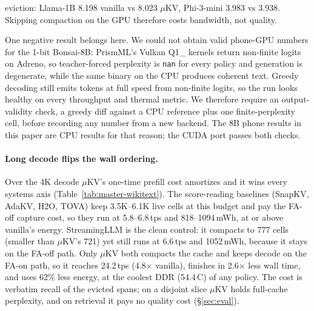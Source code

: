 \documentclass[sigconf, anonymous=false, screen=true]{acmart}
\newcommand{\ub}{\_\allowbreak}
\begin{document}
eviction: Llama-1B 8.198 vanilla vs 8.023 $\mu$KV, Phi-3-mini 3.983 vs 3.938. Skipping compaction on the GPU therefore costs bandwidth, not quality.

One negative result belongs here. We could not obtain valid phone-GPU numbers for the 1-bit Bonsai-8B: PrismML's Vulkan Q1\ub 0 kernels return non-finite logits on Adreno, so teacher-forced perplexity is \texttt{nan} for every policy and generation is degenerate, while the same binary on the CPU produces coherent text. Greedy decoding still emits tokens at full speed from non-finite logits, so the run looks healthy on every throughput and thermal metric. We therefore require an output-validity check, a greedy diff against a CPU reference plus one finite-perplexity cell, before recording any number from a new backend. The 8B phone results in this paper are CPU results for that reason; the CUDA port passes both checks.

\paragraph{Long decode flips the wall ordering.}
Over the 4K decode $\mu$KV's one-time prefill cost amortizes and it wins every systems axis (Table~\ref{tab:master-wikitext}). The score-reading baselines (SnapKV, AdaKV, H2O, TOVA) keep 3.5K--6.1K live cells at this budget and pay the FA-off capture cost, so they run at 5.8--6.8\,tps and 818--1094\,mWh, at or above vanilla's energy. StreamingLLM is the clean control: it compacts to 777 cells (smaller than $\mu$KV's 721) yet still runs at 6.6\,tps and 1052\,mWh, because it stays on the FA-off path. Only $\mu$KV both compacts the cache and keeps decode on the FA-on path, so it reaches 24.2\,tps (4.8$\times$ vanilla), finishes in 2.6$\times$ less wall time, and uses 62\% less energy, at the coolest DDR (54.4\,\textdegree C) of any policy. The cost is verbatim recall of the evicted spans; on a disjoint slice $\mu$KV holds full-cache perplexity, and on retrieval it pays no quality cost (\S\ref{sec:eval}).
\end{document}
